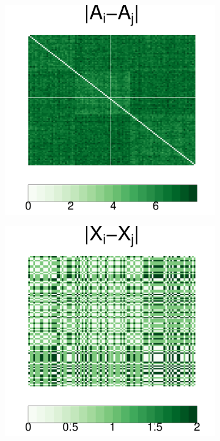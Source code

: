 \documentclass[12pt]{article}
\theoremstyle{definition}
\begin{document}
\begin{figure}[H]
\begin{subfigure}[b]{0.23\textwidth}
			\caption{}
		\label{fig:b}
	\end{subfigure}
	~ %
	\begin{subfigure}[b]{0.23\textwidth}
		\includegraphics[width=\textwidth]{../Figure/distA.pdf}
			\caption{}
		\label{fig:c}
	\end{subfigure}
		\begin{subfigure}[b]{0.23\textwidth}
			\includegraphics[width=\textwidth]{../Figure/distX.pdf}

\end{subfigure}
\end{figure}
\end{document}
